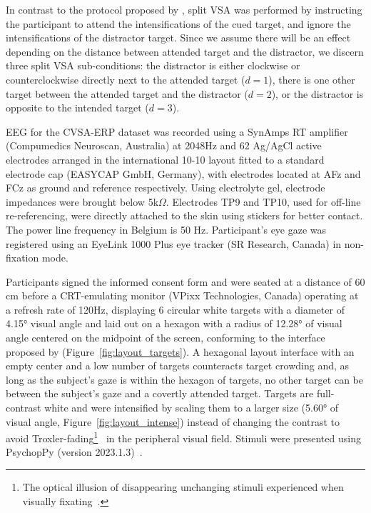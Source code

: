 In contrast to the protocol proposed by \cite{Frenzel2011}, split VSA was
performed by instructing the participant to attend the intensifications of the
cued target, and ignore the intensifications of the distractor target.
Since we assume there will be an effect depending on the distance between
attended target and the distractor, we discern three split VSA sub-conditions:
the distractor is either clockwise or counterclockwise directly next to the
attended target ($d=1$), there is one other target between the attended target and
the distractor ($d=2$), or the distractor is opposite to the intended target
($d=3$).

EEG for the CVSA-ERP dataset was recorded using a SynAmps RT amplifier
(Compumedics Neuroscan, Australia) at 2048Hz and 62 Ag/AgCl active electrodes arranged in the
international 10-10 layout fitted to a standard electrode cap (EASYCAP GmbH,
Germany), with electrodes located at AFz and FCz as ground and reference respectively.
Using electrolyte gel, electrode impedances were brought below 5k$\Omega$.
Electrodes TP9 and TP10, used for off-line re-referencing, were directly
attached to the skin using stickers for better contact.
The power line frequency in Belgium is 50 Hz.
Participant's eye gaze was registered using an EyeLink 1000 Plus eye tracker (SR Research,
Canada) in non-fixation mode.

Participants signed the informed consent form and were seated at a distance of
60 cm before a CRT-emulating monitor (VPixx
Technologies, Canada) operating at a refresh rate of 120Hz, displaying 6
circular white targets with a diameter of 4.15° visual angle and laid out on a hexagon
with a radius of 12.28° of visual angle centered on the midpoint of the screen,
conforming to the interface proposed by \cite{Treder2010} (Figure~\ref{fig:layout_targets}).
A hexagonal layout interface with an empty center and a low number of targets
counteracts target crowding and, as long as the subject’s gaze is within the hexagon of
targets, no other target can be between the subject’s gaze and a covertly
attended target.
Targets are full-contrast white and were intensified by scaling them to a
larger size (5.60° of visual angle, Figure~\ref{fig:layout_intense}) instead of changing the contrast to avoid Troxler-fading\footnote{The optical illusion of disappearing unchanging stimuli
experienced when visually fixating~\cite{Troxler1804}.}~\cite{Treder2010} in the
peripheral visual field.
Stimuli were presented using PsychopPy (version 2023.1.3)~\cite{Peirce2019}.

